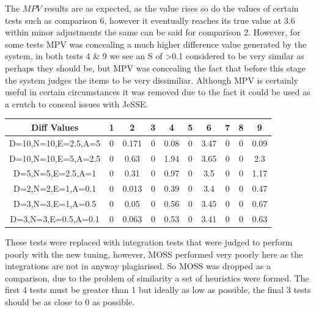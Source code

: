 \documentclass[jou,apacite]{apa6}
\begin{document}
The $MPV$ results are as expected, as the value rises so do the values of certain tests such as comparison 6, however it eventually reaches its true value at 3.6 within minor adjustments the same can be said for comparison 2. However, for some tests MPV was concealing a much higher difference value generated by the system, in both tests 4 \& 9 we see an S of >0.1 considered to be very similar as perhaps they should be, but MPV was concealing the fact that before this stage the system judges the items to be  very dissimiliar. Although MPV is certainly useful in certain circumstances it was removed due to the fact it could be used as a crutch to conceal issues with JeSSE.

\setlength{\tabcolsep}{2pt}
\renewcommand{\arraystretch}{1}

\begin{center}
 \begin{tabular}{||c c c c c c c c c c||} 
 \hline
 Diff Values & 1 & 2 & 3 & 4 & 5 & 6 & 7 & 8 & 9 \\ [-0.2ex] 
 \hline\hline
 D=10,N=10,E=2.5,A=5  & 0 & 0.171 & 0 & 0.08 & 0 & 3.47 & 0 & 0 & 0.09 \\ 
 \hline
 D=10,N=10,E=5,A=2.5  & 0 & 0.63 & 0 & 1.94 & 0 & 3.65 & 0 & 0 & 2.3  \\
 \hline
 D=5,N=5,E=2.5,A=1 & 0 & 0.31 & 0 & 0.97 & 0 & 3.5 & 0 & 0 & 1.17  \\
 \hline
  D=2,N=2,E=1,A=0.1  & 0 & 0.013 & 0 & 0.39 & 0 & 3.4 & 0 & 0 & 0.47  \\
  \hline
    D=3,N=3,E=1,A=0.5 & 0 & 0.05 & 0 & 0.56 & 0 & 3.45 & 0 & 0 & 0.67  \\
  \hline
   D=3,N=3,E=0.5,A=0.1  & 0 & 0.063 & 0 & 0.53 & 0 & 3.41 & 0 & 0 & 0.63 \\ 
  \hline
\end{tabular}
\end{center}

 These tests were replaced with integration tests that were judged to perform poorly with the new tuning, however, MOSS performed very poorly here as the integrations are not in anyway plagiarised. So MOSS was dropped as a comparison, due to the problem of similarity a set of heuristics were formed. The first 4 tests must be greater than 1 but ideally as low as possible, the final 3 tests should be as close to 0 as possible.



\end{document}
